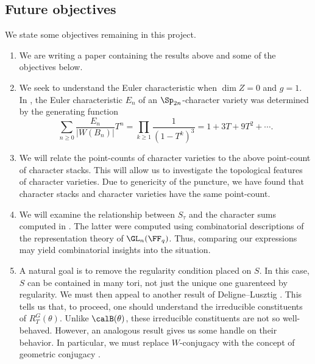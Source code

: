 \documentclass{amsart}
\theoremstyle{plain}
\theoremstyle{definition}
\theoremstyle{remark}
\begin{document}
\subsection*{Future objectives}
We state some objectives remaining in this project.
\begin{enumerate}[\itshape(i)]
\item We are writing a paper \cite{KNW} containing the results above and some of the objectives below.
\item We seek to understand the Euler characteristic when $\dim Z=0$ and $g=1$. In \cite{Cambo17}, the Euler characteristic $E_n$ of an $\Sp_{2n}$-character variety was determined by the generating function
\[
\sum_{n\geq 0} \frac{E_n}{|W(B_n)|} T^n = \prod_{k\geq 1} \frac{1}{(1-T^k)^3} = 1 + 3T + 9T^2 + \cdots.
\]
\item We will relate the point-counts of character varieties to the above point-count of character stacks. This will allow us to investigate the topological features of character varieties. Due to genericity of the puncture, we have found that character stacks and character varieties have the same point-count. 
\item We will examine the relationship between $S_\tau$ and the character sums computed in \cite{HLRV11}. The latter were computed using combinatorial descriptions of the representation theory of $\GL_n(\FF_q)$. Thus, comparing our expressions may yield combinatorial insights into the situation. 
\item A natural goal is to remove the regularity condition placed on $S$. In this case, $S$ can be contained in many tori, not just the unique one guarenteed by regularity. We must then appeal to another result of Deligne--Lusztig \cite[Corollary 7.6]{DL76}. This tells us that, to proceed, one should understand the irreducible constituents of $R_T^G(\theta)$. Unlike $\calB(\theta)$, these irreducible constituents are not so well-behaved. However, an analogous result \cite[Theorem 2.3.2]{GM20} gives us some handle on their behavior. In particular, we must replace $W$-conjugacy with the concept of geometric conjugacy \cite[Definition 5.5]{DL76}.
\end{enumerate}
\end{document}
